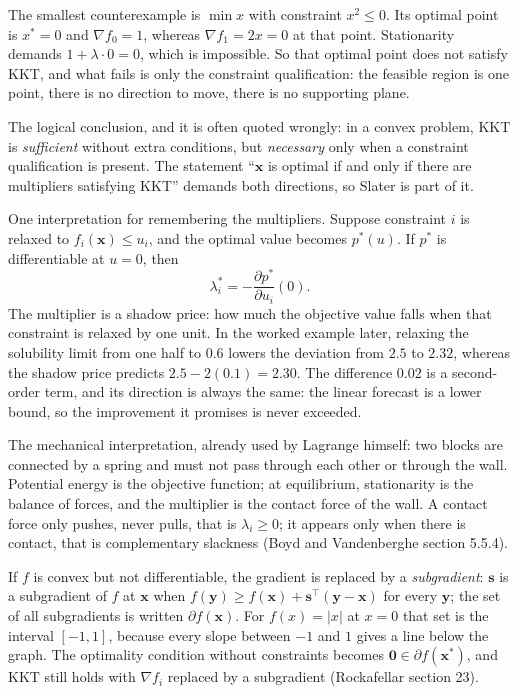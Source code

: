 The smallest counterexample is $\min x$ with constraint $x^{2}\le0$. Its optimal point is
$x^{*}=0$ and $\nabla f_{0}=1$, whereas $\nabla f_{1}=2x=0$ at that point. Stationarity demands
$1+\lambda\cdot0=0$, which is impossible. So that optimal point does not satisfy KKT, and what
fails is only the constraint qualification: the feasible region is one point, there is no
direction to move, there is no supporting plane.

The logical conclusion, and it is often quoted wrongly: in a convex problem, KKT is
\emph{sufficient} without extra conditions, but \emph{necessary} only when a constraint
qualification is present. The statement ``$\mathbf{x}$ is optimal if and only if there are
multipliers satisfying KKT'' demands both directions, so Slater is part of it.

One interpretation for remembering the multipliers. Suppose constraint $i$ is relaxed to
$f_{i}(\mathbf{x})\le u_{i}$, and the optimal value becomes $p^{*}(u)$. If $p^{*}$ is
differentiable at $u=0$, then
\[
  \lambda_{i}^{*}=-\frac{\partial p^{*}}{\partial u_{i}}(0).
\]
The multiplier is a shadow price: how much the objective value falls when that constraint is
relaxed by one unit. In the worked example later, relaxing the solubility limit from one half
to $0.6$ lowers the deviation from $2.5$ to $2.32$, whereas the shadow price predicts
$2.5-2(0.1)=2.30$. The difference $0.02$ is a second-order term, and its direction is always
the same: the linear forecast is a lower bound, so the improvement it promises is never
exceeded.

The mechanical interpretation, already used by Lagrange himself: two blocks are connected by a
spring and must not pass through each other or through the wall. Potential energy is the
objective function; at equilibrium, stationarity is the balance of forces, and the multiplier
is the contact force of the wall. A contact force only pushes, never pulls, that is
$\lambda_{i}\ge0$; it appears only when there is contact, that is complementary slackness (Boyd
and Vandenberghe section 5.5.4).

\begin{catatan}[Subgradients]
If $f$ is convex but not differentiable, the gradient is replaced by a \emph{subgradient}:
$\mathbf{s}$ is a subgradient of $f$ at $\mathbf{x}$ when
$f(\mathbf{y})\ge f(\mathbf{x})+\mathbf{s}^{\top}(\mathbf{y}-\mathbf{x})$ for every
$\mathbf{y}$; the set of all subgradients is written $\partial f(\mathbf{x})$. For
$f(x)=|x|$ at $x=0$ that set is the interval $[-1,1]$, because every slope between $-1$ and
$1$ gives a line below the graph. The optimality condition without constraints becomes
$\mathbf{0}\in\partial f(\mathbf{x}^{*})$, and KKT still holds with $\nabla f_{i}$ replaced by
a subgradient (Rockafellar section 23).
\end{catatan}

